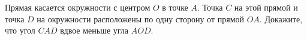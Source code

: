 \begin{ex}
	\begin{condition}
		Прямая касается окружности с центром \( O  \) в точке \( A \). Точка \( C  \) на этой прямой и точка \( D  \) на окружности расположены по одну сторону от прямой \( OA \). Докажите, что угол \( CAD  \) вдвое	меньше угла \( AOD \).
	\end{condition}
\end{ex}
